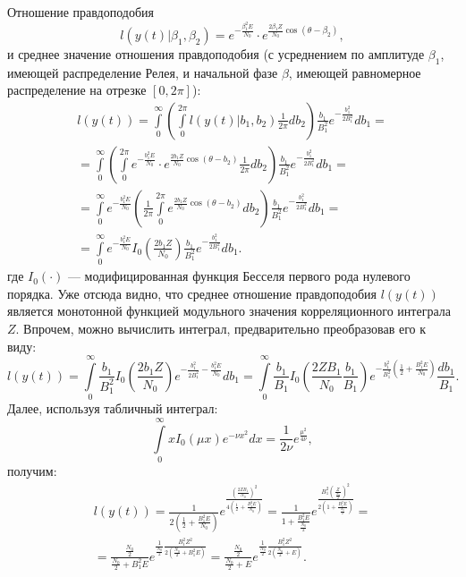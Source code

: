 \documentclass[a4paper,12pt]{article}
\begin{document}
    Отношение правдоподобия
    \[
        l(y(t) | \beta_1, \beta_2 ) = e^{-\frac{\beta_1^2 E}{N_0}} \cdot e^{\frac{2 \beta_1 Z}{N_0} \cos ( \theta - \beta_2)} ,
    \]
    и среднее значение отношения правдоподобия (с усреднением по амплитуде $\beta_1$, имеющей распределение Релея, и начальной фазе $\beta$, имеющей равномерное
    распределение на отрезке $[0, 2 \pi]$):
    \begin{multline*}
        l(y(t))
        = \int \limits_0^{\infty} \left ( \int \limits_0^{2 \pi} l(y(t) | b_1, b_2) \frac{1}{2 \pi} d b_2 \right ) \frac{b_1}{B_1^2} e^{- \frac{b_1^2}{2 B_1^2}} d b_1 = \\
        = \int \limits_0^{\infty} \left ( \int \limits_0^{2 \pi} e^{-\frac{b_1^2 E}{N_0}} \cdot e^{\frac{2 b_1 Z}{N_0} \cos ( \theta - b_2)} \frac{1}{2 \pi} d b_2 \right ) \frac{b_1}{B_1^2} e^{- \frac{b_1^2}{2 B_1^2}} d b_1 = \\
        = \int \limits_0^{\infty} e^{-\frac{b_1^2 E}{N_0}} \left ( \frac{1}{2 \pi} \int \limits_0^{2 \pi} e^{\frac{2 b_1 Z}{N_0} \cos ( \theta - b_2)} d b_2 \right ) \frac{b_1}{B_1^2} e^{- \frac{b_1^2}{2 B_1^2}} d b_1 = \\
        = \int \limits_0^{\infty} e^{-\frac{b_1^2 E}{N_0}} I_0 \left ( \frac{2 b_1 Z}{N_0} \right ) \frac{b_1}{B_1^2} e^{- \frac{b_1^2}{2 B_1^2}} d b_1 .
    \end{multline*}
    где $I_0(\cdot)$ --- модифицированная функция Бесселя первого рода нулевого порядка. Уже отсюда видно, что среднее отношение правдоподобия $l(y(t))$ является монотонной
    функцией модульного значения корреляционного интеграла $Z$. Впрочем, можно вычислить интеграл, предварительно преобразовав его к виду:
    \[
        l(y(t))
        = \int \limits_0^{\infty} \frac{b_1}{B_1^2} I_0 \left ( \frac{2 b_1 Z}{N_0} \right ) e^{- \frac{b_1^2}{2 B_1^2} -\frac{b_1^2 E}{N_0}} d b_1
        = \int \limits_0^{\infty} \frac{b_1}{B_1} I_0 \left ( \frac{2 Z B_1}{N_0} \frac{b_1}{B_1} \right ) e^{- \frac{b_1^2}{B_1^2} \left ( \frac{1}{2} + \frac{B_1^2 E}{N_0} \right )} \frac{d b_1}{B_1}.
    \]
    Далее, используя табличный интеграл:
    \[
        \int \limits_0^{\infty} x I_0(\mu x) e^{-\nu x^2} dx = \frac{1}{2 \nu} e^{\frac{\mu^2}{4 \nu}},
    \]
    получим:
    \begin{multline*}
        l(y(t))
        = \frac{1}{2 \left ( \frac{1}{2} + \frac{B_1^2 E}{N_0} \right )} e^{\frac{\left ( \frac{2 Z B_1}{N_0} \right )^2}{4 \left ( \frac{1}{2} + \frac{B_1^2 E}{N_0} \right )}}
        = \frac{1}{1 + \frac{B_1^2 E}{\frac{N_0}{2}}} e^{\frac{B_1^2 \left ( \frac{Z}{\frac{N_0}{2}} \right )^2}{2 \left ( 1 + \frac{B_1^2 E}{\frac{N_0}{2}} \right )}} = \\
        = \frac{\frac{N_0}{2}}{\frac{N_0}{2} + B_1^2 E} e^{\frac{1}{\frac{N_0}{2}} \frac{B_1^2 Z^2}{2 \left ( \frac{N_0}{2} + B_1^2 E \right )}}
        = \frac{\frac{N_0}{2}}{\frac{N_0}{2} + E} e^{\frac{1}{\frac{N_0}{2}} \frac{B_1^2 Z^2}{2 \left ( \frac{N_0}{2} + E \right )}}
        .
    \end{multline*}
\end{document}
